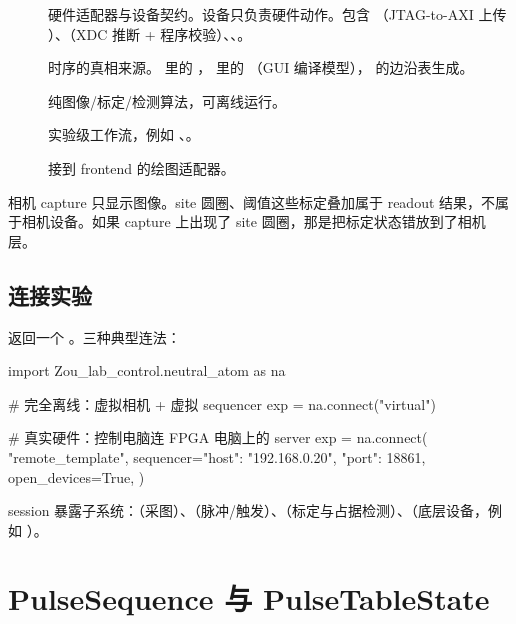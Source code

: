 \documentclass[11pt,oneside,openany]{book}
\begin{document}
\begin{description}
  \item[] 硬件适配器与设备契约。设备只负责硬件动作。包含 （JTAG-to-AXI 上传 ）、（XDC 推断 + 程序校验）、、。
  \item[] 时序的真相来源。 里的 ， 里的 （GUI 编译模型）， 的边沿表生成。
  \item[] 纯图像/标定/检测算法，可离线运行。
  \item[] 实验级工作流，例如 、。
  \item[] 接到 frontend 的绘图适配器。
\end{description}

\begin{notebox}[一个关键不变式]
相机 capture 只显示图像。site 圆圈、阈值这些标定叠加属于 readout 结果，不属于相机设备。如果 capture 上出现了 site 圆圈，那是把标定状态错放到了相机层。
\end{notebox}

\section{连接实验}
 返回一个 。三种典型连法：

\begin{codeblock}[Python]
import Zou_lab_control.neutral_atom as na

# 完全离线：虚拟相机 + 虚拟 sequencer
exp = na.connect("virtual")

# 真实硬件：控制电脑连 FPGA 电脑上的 server
exp = na.connect(
    "remote_template",
    sequencer={"host": "192.168.0.20", "port": 18861},
    open_devices=True,
)
\end{codeblock}

session 暴露子系统：（采图）、（脉冲/触发）、（标定与占据检测）、（底层设备，例如 ）。

\chapter{PulseSequence 与 PulseTableState}
\end{document}

